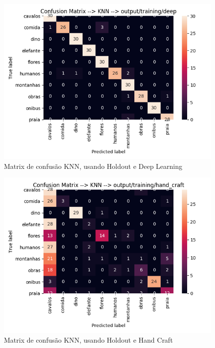 \documentclass[
article,			%
11pt,				%
oneside,			%
a4paper,			%
english,			%
brazil,				%
sumario=tradicional,
]{abntex2}
\begin{document}
\begin{anexosenv}
\begin{figure}[htb]
	\caption{\label{confusion-matrix-knn-hodoult-deep}Matrix de confusão KNN, usando Holdout e Deep Learning}
	\begin{center}
		\includegraphics[scale=0.5]{confusion-matrix-knn-deep.png}
	\end{center}
\end{figure}

\begin{figure}[htb]
	\caption{\label{confusion-matrix-knn-hodoult-hand-craft}Matrix de confusão KNN, usando Holdout e Hand Craft}
	\begin{center}
		\includegraphics[scale=0.5]{confusion-matrix-knn-holdout-hand-craft.png}
	\end{center}
\end{figure}



\end{anexosenv}
\end{document}
